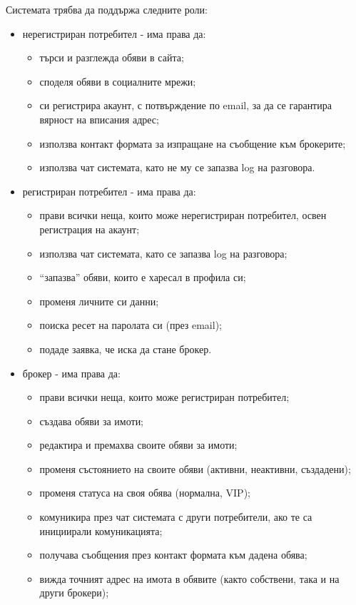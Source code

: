 \documentclass[]{article}
\begin{document}
\begin{enumerate}[I.]
{%
Системата трябва да поддържа следните роли:
	\begin{itemize}
	\item {нерегистриран потребител - има права да:
		\begin{itemize}
		\item търси и разглежда обяви в сайта;
		\item споделя обяви в социалните мрежи;
		\item си регистрира акаунт, с потвърждение по email, за да се гарантира вярност на вписания адрес;
		\item използва контакт формата за изпращане на съобщение към брокерите;
		\item използва чат системата, като не му се запазва log на разговора.
		\end{itemize}
	}
	\item {регистриран потребител - има права да:
		\begin{itemize}
		\item прави всички неща, които може нерегистриран потребител, освен регистрация на акаунт;
		\item използва чат системата, като се запазва log на разговора;
		\item ``запазва'' обяви, които е харесал в профила си;
		\item променя личните си данни;
		\item поиска ресет на паролата си (през email);
		\item подаде заявка, че иска да стане брокер.
		\end{itemize}
	}
	\item {брокер - има права да:
		\begin{itemize}
		\item прави всички неща, които може регистриран потребител;
		\item създава обяви за имоти;
		\item редактира и премахва своите обяви за имоти;
		\item променя състоянието на своите обяви (активни, неактивни, създадени);
		\item променя статуса на своя обява (нормална, VIP);
		\item комуникира през чат системата с други потребители, ако те са инициирали комуникацията;
		\item получава съобщения през контакт формата към дадена обява;
		\item вижда точният адрес на имота в обявите (както собствени, така и на други брокери);

\end{itemize}}
\end{itemize}}
\end{enumerate}
\end{document}
